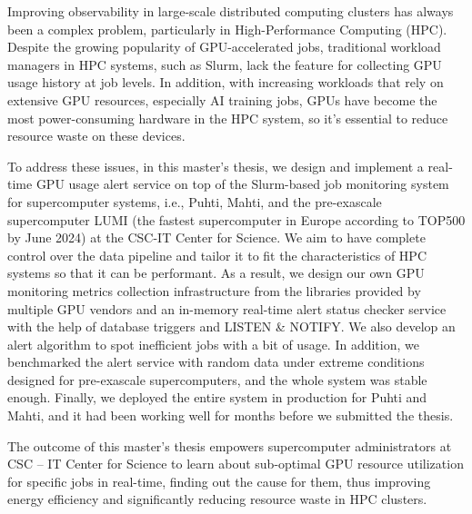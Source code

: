 Improving observability in large-scale distributed computing clusters has always been a complex problem, particularly in High-Performance Computing (HPC). Despite the growing popularity of GPU-accelerated jobs, traditional workload managers in HPC systems, such as Slurm, lack the feature for collecting GPU usage history at job levels. In addition, with increasing workloads that rely on extensive GPU resources, especially AI training jobs, GPUs have become the most power-consuming hardware in the HPC system, so it's essential to reduce resource waste on these devices.

To address these issues, in this master's thesis, we design and implement a real-time GPU usage alert service on top of the Slurm-based job monitoring system for supercomputer systems, i.e., Puhti, Mahti, and the pre-exascale supercomputer LUMI (the fastest supercomputer in Europe according to TOP500 by June 2024) at the CSC-IT Center for Science. We aim to have complete control over the data pipeline and tailor it to fit the characteristics of HPC systems so that it can be performant. As a result, we design our own GPU monitoring metrics collection infrastructure from the libraries provided by multiple GPU vendors and an in-memory real-time alert status checker service with the help of database triggers and LISTEN \& NOTIFY. We also develop an alert algorithm to spot inefficient jobs with a bit of usage. In addition, we benchmarked the alert service with random data under extreme conditions designed for pre-exascale supercomputers, and the whole system was stable enough. Finally, we deployed the entire system in production for Puhti and Mahti, and it had been working well for months before we submitted the thesis.

The outcome of this master's thesis empowers supercomputer administrators at CSC -- IT Center for Science to learn about sub-optimal GPU resource utilization for specific jobs in real-time, finding out the cause for them, thus improving energy efficiency and significantly reducing resource waste in HPC clusters.
